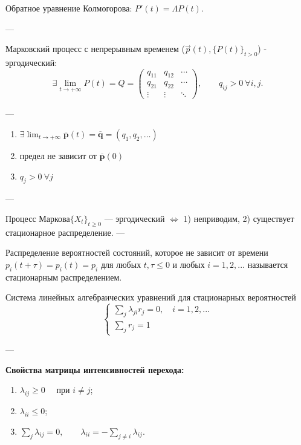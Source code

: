 Обратное уравнение Колмогорова: $P'(t)=\Lambda P(t)$.

---

Марковский процесс с непрерывным временем ($\vec{p}(t), \{P(t)\}_{t>0}$) - эргодический:
\[
	\exists \lim_{t \to +\infty} {P}(t) = {Q}
	=
	\begin{pmatrix}
		q_{11} & q_{12} & \cdots \\
		q_{21} & q_{22} & \cdots \\
		\vdots & \vdots & \ddots
	\end{pmatrix},
	\qquad
	q_{ij} > 0 \ \forall i,j.
\]

---

\begin{enumerate}
	\item
	      $\displaystyle
		      \exists \lim_{t \to +\infty}
		      \overline{\mathbf{p}}(t)
		      =
		      \overline{\mathbf{q}}
		      = (q_1, q_2, \ldots)
	      $

	\item предел не зависит от $\overline{\mathbf{p}}(0)$

	\item $q_j > 0 \ \forall j$
\end{enumerate}

---

Процесс Маркова$\{ X_t \}_{t \ge 0}$ — эргодический $\Longleftrightarrow$
1) неприводим, 2) существует стационарное распределение.
---

Распределение вероятностей состояний, которое не зависит от времени $p_i(t+\tau ) = p_i(t)=p_i$
для любых $t,\tau\leq 0$ и любых $i=1,2,...$ называется стационарным распределением.

Система линейных алгебраических уравнений для стационарных вероятностей
\[
	\begin{cases}
		\sum_j  \lambda_{ji} r_j = 0, \quad i=1,2,... \\
		\sum_j r_j = 1
	\end{cases}
\]

---

\textbf{Свойства матрицы интенсивностей перехода:}
\begin{enumerate}
	\item $\lambda_{ij} \ge 0 \quad$ при $i \ne j$;
	\item $\lambda_{ii} \le 0$;
	\item $\displaystyle \sum_j \lambda_{ij} = 0,
		      \qquad
		      \lambda_{ii} = - \sum_{j \ne i} \lambda_{ij}.$
\end{enumerate}

